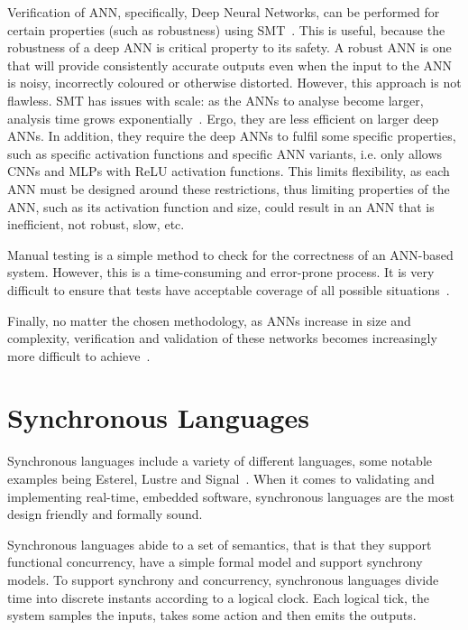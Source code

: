 Verification of \ac{ANN}, specifically, Deep Neural Networks, can be performed for certain properties (such as robustness) using \ac{SMT}~\cite{Gehr2018AI2SA,reluplex,DeepANNverify}.
This is useful, because the robustness of a deep \ac{ANN} is critical property to its safety.
A robust \ac{ANN} is one that will provide consistently accurate outputs even when the input to the \ac{ANN} is noisy, incorrectly coloured or otherwise distorted. 
However, this approach is not flawless. 
\ac{SMT} has issues with scale: as the \acp{ANN} to analyse become larger, analysis time grows exponentially~\cite{Gehr2018AI2SA}.
Ergo, they are less efficient on larger deep \acp{ANN}.
In addition, they require the deep \acp{ANN} to fulfil some specific properties, such as specific activation functions and specific \ac{ANN} variants, i.e. \cite{Gehr2018AI2SA} only allows \acp{CNN} and \acp{MLP} with \ac{ReLU} activation functions.
This limits flexibility, as each \ac{ANN} must be designed around these restrictions, thus limiting properties of the \ac{ANN}, such as its activation function and size, could result in an \ac{ANN} that is inefficient, not robust, slow, etc.

Manual testing is a simple method to check for the correctness of an \ac{ANN}-based system. 
However, this is a time-consuming and error-prone process.
It is very difficult to ensure that tests have acceptable coverage of all possible situations~\cite{ANN-test}.

Finally, no matter the chosen methodology, as \acp{ANN} increase in size and complexity, verification and validation of these networks becomes increasingly more difficult to achieve~\cite{Gehr2018AI2SA}.




\section{Synchronous Languages}
Synchronous languages include a variety of different languages, some notable examples being Esterel, Lustre and Signal~\cite{benveniste2003synchronous}.
When it comes to validating and implementing real-time, embedded software, synchronous languages are the most design friendly and formally sound.

Synchronous languages abide to a set of semantics, that is that they support functional concurrency, have a simple formal model and support synchrony models.
To support synchrony and concurrency, synchronous languages divide time into discrete instants according to a logical clock.
Each logical tick, the system samples the inputs, takes some action and then emits the outputs.

